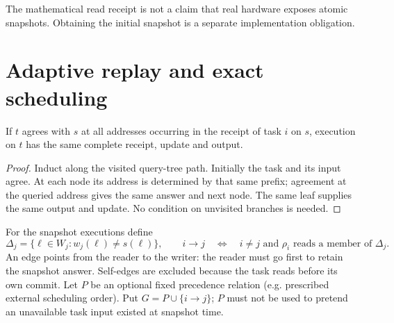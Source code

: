 \documentclass[11pt]{article}
\begin{document}
The mathematical read receipt is not a claim that real hardware exposes atomic snapshots. Obtaining the initial snapshot is a separate implementation obligation.
\section{Adaptive replay and exact scheduling}
\begin{lemma}[Replay]
If $t$ agrees with $s$ at all addresses occurring in the receipt of task $i$ on $s$, execution on $t$ has the same complete receipt, update and output.
\end{lemma}
\begin{proof}
Induct along the visited query-tree path. Initially the task and its input agree. At each node its address is determined by that same prefix; agreement at the queried address gives the same answer and next node. The same leaf supplies the same output and update. No condition on unvisited branches is needed.
\end{proof}
For the snapshot executions define
\[
 \Delta_j=\{\ell\in W_j:w_j(\ell)\ne s(\ell)\},\qquad
 i\longrightarrow j\quad\Longleftrightarrow\quad i\ne j\text{ and }\rho_i\text{ reads a member of }\Delta_j.
\]
An edge points from the reader to the writer: the reader must go first to retain the snapshot answer. Self-edges are excluded because the task reads before its own commit. Let $P$ be an optional fixed precedence relation (e.g. prescribed external scheduling order). Put $G=P\cup\{i\to j\}$; $P$ must not be used to pretend an unavailable task input existed at snapshot time.
\end{document}
